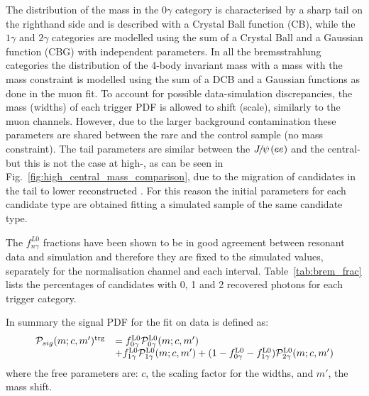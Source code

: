 The distribution of the \mKpiee mass in the $0\gamma$ category is characterised by a sharp tail on the righthand side and is described 
with a Crystal Ball function (CB), while the $1\gamma$ and $2\gamma$ categories are modelled using the sum of a Crystal Ball 
and a Gaussian function (CBG) with independent parameters. In all the bremsstrahlung categories the distribution of the 4-body 
invariant mass with a mass with the \jpsi mass constraint is modelled using the sum of a DCB and a Gaussian functions as done in the muon fit.
%
To account for possible data-simulation discrepancies, the mass (widths) of each trigger PDF is allowed to shift (scale), similarly to the muon channels.
However, due to the larger background contamination these parameters are shared between the rare and the \BdToKstJPsee control sample
(no \jpsi mass constraint).
The tail parameters are similar between the $\jpsi(ee)$ and the central-\qsq but this is not the case at high-\qsq, as can be seen
in Fig.~\ref{fig:high_central_mass_comparison}, due to the migration of candidates in the tail to lower reconstructed \qsq.
For this reason the initial parameters for each candidate type are obtained fitting a simulated sample of the same candidate type. 


The $f^{L0}_{n\gamma}$ fractions have been shown to be in good agreement between 
resonant data and simulation and therefore they are fixed to the simulated values, separately
for the normalisation channel and each \qsq interval. Table~\ref{tab:brem_frac} lists the percentages
of candidates with 0, 1 and 2 recovered photons for each trigger category.

In summary the signal PDF for the fit on data is defined as:
%
\begin{equation}
\begin{array} {ll}
\mathcal{P}_{sig}(m;c,m')^{\rm trg} & = f^{\rm L0}_{0\gamma} \mathcal{P}^{\rm L0}_{0\gamma}(m;c,m')  \\
& + f^{\rm L0}_{1\gamma} \mathcal{P}^{\rm L0}_{1\gamma}(m;c,m') + (1 - f^{\rm L0}_{0\gamma} - f^{\rm L0}_{1\gamma}) \mathcal{P}^{\rm L0}_{2\gamma}(m;c,m')
\end{array} 
\end{equation}
%
where the free parameters are: $c$, the scaling factor for the widths, and $m'$, the mass shift.


